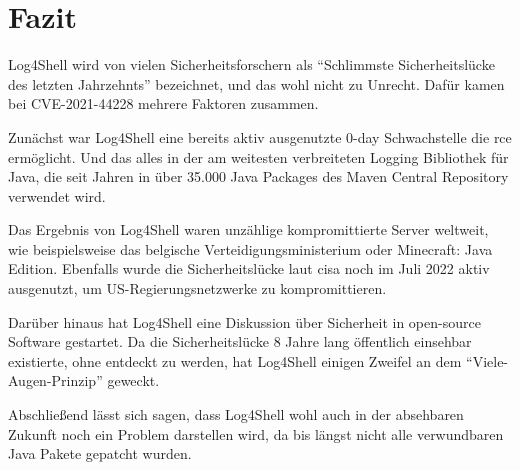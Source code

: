
\section{Fazit}\label{sec:fazit}
Log4Shell wird von vielen Sicherheitsforschern als ``Schlimmste Sicherheitslücke des letzten Jahrzehnts'' bezeichnet, und das wohl nicht zu Unrecht.
Dafür kamen bei CVE-2021-44228 mehrere Faktoren zusammen.

Zunächst war Log4Shell eine bereits aktiv ausgenutzte 0-day Schwachstelle die \gls{rce} ermöglicht.
Und das alles in der am weitesten verbreiteten Logging Bibliothek für Java, die seit Jahren in über 35.000 Java Packages des Maven Central Repository verwendet wird.

\bigskip
Das Ergebnis von Log4Shell waren unzählige kompromittierte Server weltweit, wie beispielsweise das belgische Verteidigungsministerium oder Minecraft: Java Edition.
Ebenfalls wurde die Sicherheitslücke laut \gls{cisa} noch im Juli 2022 aktiv ausgenutzt, um US-Regierungsnetzwerke zu kompromittieren.

Darüber hinaus hat Log4Shell eine Diskussion über Sicherheit in open-source Software gestartet.
Da die Sicherheitslücke 8 Jahre lang öffentlich einsehbar existierte, ohne entdeckt zu werden, hat Log4Shell einigen Zweifel an dem ``Viele-Augen-Prinzip'' geweckt.

\bigskip
Abschließend lässt sich sagen, dass Log4Shell wohl auch in der absehbaren Zukunft noch ein Problem darstellen wird, da bis längst nicht alle verwundbaren Java Pakete gepatcht wurden.
